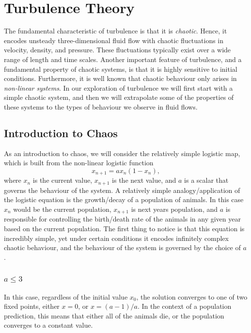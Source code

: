 \section{Turbulence Theory}
The fundamental characteristic of turbulence is that it is {\it chaotic}. Hence, it encodes unsteady three-dimensional fluid flow with chaotic fluctuations in velocity, density, and pressure. These fluctuations typically exist over a wide range of length and time scales. Another important feature of turbulence, and a fundamental property of chaotic systems, is that it is highly sensitive to initial conditions. Furthermore, it is well known that chaotic behaviour only arises in {\it non-linear systems}. In our exploration of turbulence we will first start with a simple chaotic system, and then we will extrapolate some of the properties of these systems to the types of behaviour we observe in fluid flows.

\subsection{Introduction to Chaos}
As an introduction to chaos, we will consider the relatively simple logistic map, which is built from the non-linear logistic function~\cite{strogatz2018nonlinear}
\begin{equation}
	x_{n+1} = ax_n(1-x_n),
	\label{eq:logistic_function}
\end{equation}
where $x_n$ is the current value, $x_{n+1}$ is the next value, and $a$ is a scalar that governs the behaviour of the system. A relatively simple analogy/application of the logistic equation is the growth/decay of a population of animals. In this case $x_n$ would be the current population, $x_{n+1}$ is next years population, and $a$ is responsible for controlling the birth/death rate of the animals in any given year based on the current population. The first thing to notice is that this equation is incredibly simple, yet under certain conditions it encodes infinitely complex chaotic behaviour, and the behaviour of the system is governed by the choice of $a$.

\subsubsection{$a\leq 3$}
In this case, regardless of the initial value $x_0$, the solution converges to one of two fixed points, either $x=0$, or $x=(a-1)/a$. In the context of a population prediction, this means that either all of the animals die, or the population converges to a constant value.

